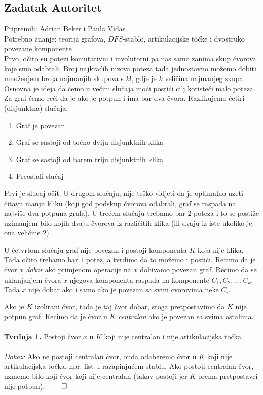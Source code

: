 \subsection*{Zadatak Autoritet}
\textsf{Pripremili: Adrian Beker i Paula Vidas}\\
\textsf{Potrebno znanje: teorija grafova, $DFS$-stablo, artikulacijske točke i dvostruko povezane komponente}\\
Prvo, očito su potezi komutativni i involutorni pa nas samo zanima skup čvorova koje smo odabrali. Broj najkraćih nizova poteza tada jednostavno možemo dobiti množenjem broja najmanjih skupova s $k!$, gdje je $k$ veličina najmanjeg skupa. Osnovna je ideja da ćemo u većini slučaja moći postići cilj koristeći malo poteza. Za graf ćemo reći da je  ako je potpun i ima bar dva čvora. Razlikujemo četiri (disjunktna) slučaja:

\begin{enumerate}
    \item Graf je povezan
    \item Graf se sastoji od točno dviju disjunktnih klika
    \item Graf se sastoji od barem triju disjunktnih klika
    \item Preostali slučaj
\end{enumerate}
Prvi je slucaj očit. U drugom slučaju, nije teško vidjeti da je optimalno uzeti čitavu manju kliku (koji god podskup čvorova odabrali, graf se raspada na najviše dva potpuna grafa).
U trećem slučaju trebamo bar $2$ poteza i to se postiže uzimanjem bilo kojih dvaju čvorova iz različitih klika (ili dvaju iz iste ukoliko je ona veličine $2$).

U četvrtom slučaju graf nije povezan i postoji komponenta $K$ koja nije klika. Tada očito trebamo bar $1$ potez, a tvrdimo da to možemo i postići. Recimo da je čvor $x$ \textit{dobar} ako primjenom operacije na $x$ dobivamo povezan graf. Recimo da se uklanjanjem čvora $x$ njegova komponenta raspada na komponente $C_1, C_2, …, C_k$. Tada $x$ nije dobar ako i samo ako je povezan sa svim cvorovima neke $C_i$.

Ako je $K$ izolirani čvor, tada je taj čvor dobar, stoga pretpostavimo da $K$ nije potpun graf. Recimo da je čvor u $K$ \textit{centralan} ako je povezan sa svima ostalima.
\\\\
\textbf{Tvrdnja 1.} Postoji čvor $x$ u $K$ koji nije centralan i nije artikulacijska točka.
\\\\
\textit{Dokaz:} Ako ne postoji centralan čvor, onda odaberemo čvor u $K$ koji nije artikulacijska točka, npr. list u razapinjućem stablu. Ako postoji centralan čvor, uzmemo bilo koji čvor koji nije centralan (takav postoji jer $K$ prema pretpostavci nije potpun). $\qed$

